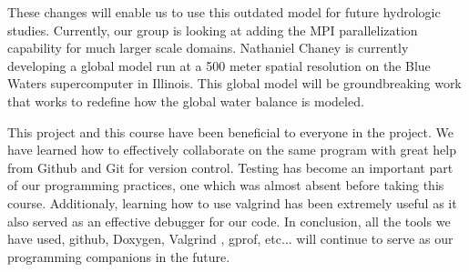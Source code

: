 \documentclass[pdftex,12pt,a4paper]{article}
\begin{document}
These changes will enable us to use this outdated model for future hydrologic studies. Currently, our group is looking at adding the MPI parallelization capability for much larger scale domains. Nathaniel Chaney is currently developing a global model run at a 500 meter spatial resolution on the Blue Waters supercomputer in Illinois. This global model will be groundbreaking work that works to redefine how the global water balance is modeled.

This project and this course have been beneficial to everyone in the project. We have learned how to effectively collaborate on the same program with great help from Github and Git for version control. Testing has become an important part of our programming practices, one which was almost absent before taking this course. Additionaly, learning how to use valgrind has been extremely useful as it also served as an effective debugger for our code. In conclusion, all the tools we have used, github, Doxygen, Valgrind , gprof, etc... will continue to serve as our programming companions in the future.
\end{document}
